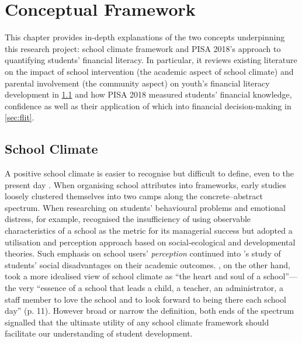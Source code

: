 \documentclass[a4paper,11pt,UKenglish,twoside,openright]{report}\usepackage[]{graphicx}\usepackage[]{color}
\begin{document}

\chapter{Conceptual Framework}
\label{chp:2}





This chapter provides in-depth explanations of the two concepts underpinning this research project:  school climate framework and PISA 2018's approach to quantifying students' financial literacy. In particular, it reviews existing literature on the impact of school intervention (the academic aspect of school climate) and parental involvement (the community aspect) on youth's financial literacy development in \cref{sec:sc} and how PISA 2018 measured students' financial knowledge, confidence as well as their application of which into financial decision-making in \cref{sec:flit}.

\section{School Climate}\label{sec:sc}

A positive school climate is easier to recognise but difficult to define, even to the present day \parencite{PISAvol3}. When organising school attributes into frameworks, early studies loosely clustered themselves into two camps along the concrete--abstract spectrum. When researching on students' behavioural problems and emotional distress, for example, \textcite{kuperminc:1997} recognised the insufficiency of using observable characteristics of a school as the metric for its managerial success but adopted a utilisation and perception approach based on social-ecological and developmental theories. Such emphasis on school users' \emph{perception} continued into \textcite{esposito:1999}'s study of students' social disadvantages on their academic outcomes. \textcite{freiberg:1999}, on the other hand, took a more idealised view of school climate as ``the heart and soul of a school''---the very ``essence of a school that leads a child, a teacher, an administrator, a staff member to love the school and to look forward to being there each school day'' (p. 11). However broad or narrow the definition, both ends of the spectrum signalled that the ultimate utility of any school climate framework should facilitate our understanding of student development.
\end{document}
